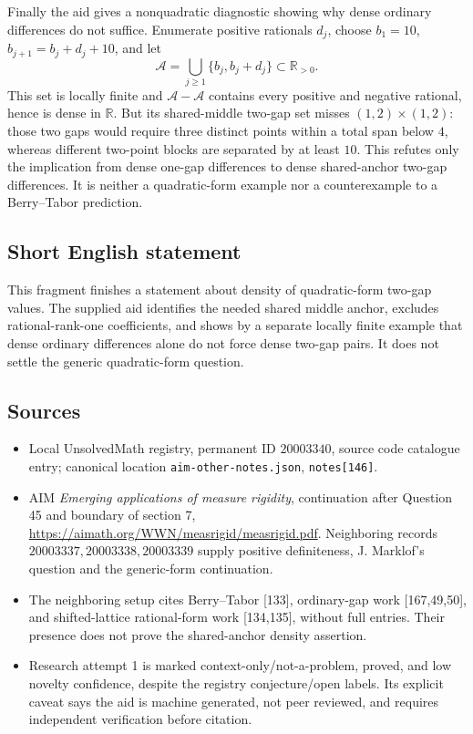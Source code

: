 \documentclass[11pt]{article}
\newcommand{\R}{\mathbb{R}}
\begin{document}
Finally the aid gives a nonquadratic diagnostic showing why dense ordinary differences do not suffice. Enumerate positive rationals $d_j$, choose $b_1=10$, $b_{j+1}=b_j+d_j+10$, and let
\[
 \mathcal A=\bigcup_{j\geq1}\{b_j,b_j+d_j\}\subset\R_{>0}.
\]
This set is locally finite and $\mathcal A-\mathcal A$ contains every positive and negative rational, hence is dense in $\R$. But its shared-middle two-gap set misses $(1,2)\times(1,2)$: those two gaps would require three distinct points within a total span below $4$, whereas different two-point blocks are separated by at least $10$. This refutes only the implication from dense one-gap differences to dense shared-anchor two-gap differences. It is neither a quadratic-form example nor a counterexample to a Berry--Tabor prediction.
\subsection{Short English statement}
This fragment finishes a statement about density of quadratic-form two-gap values. The supplied aid identifies the needed shared middle anchor, excludes rational-rank-one coefficients, and shows by a separate locally finite example that dense ordinary differences alone do not force dense two-gap pairs. It does not settle the generic quadratic-form question.
\subsection{Sources}
\begin{itemize}
\item Local UnsolvedMath registry, permanent ID $20003340$, source code catalogue entry; canonical location \texttt{aim-other-notes.json}, \texttt{notes[146]}.
\item AIM \emph{Emerging applications of measure rigidity}, continuation after Question 45 and boundary of section 7, \url{https://aimath.org/WWN/measrigid/measrigid.pdf}. Neighboring records $20003337,20003338,20003339$ supply positive definiteness, J. Marklof's question and the generic-form continuation.
\item The neighboring setup cites Berry--Tabor [133], ordinary-gap work [167,49,50], and shifted-lattice rational-form work [134,135], without full entries. Their presence does not prove the shared-anchor density assertion.
\item Research attempt 1 is marked context-only/not-a-problem, proved, and low novelty confidence, despite the registry conjecture/open labels. Its explicit caveat says the aid is machine generated, not peer reviewed, and requires independent verification before citation.
\end{itemize}
\end{document}
